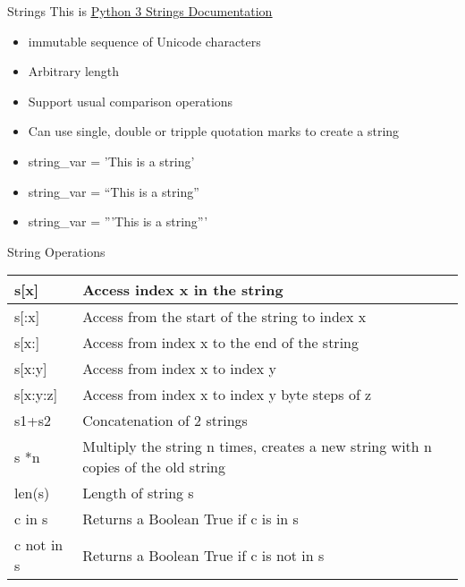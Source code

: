 % 
% 
% 
\begin{Slide}{Strings}
  This is \underline{\href{https://docs.python.org/3/library/stdtypes.html\#text-sequence-type-str}{Python 3 Strings Documentation}}\\
  \begin{itemize}
  \item immutable sequence of Unicode characters
  \item Arbitrary length
  \item Support usual comparison operations 
  \item Can use single, double or tripple quotation marks to create a string
  \item string\_var = 'This is a string'
  \item string\_var = ``This is a string''
  \item string\_var = '''This is a string'''

  \end{itemize}
\end{Slide}

% 
% 
% 
\begin{Slide}{String Operations}


  \begin{table}[h]
    \begin{tabular}{|l|p{8cm}|} \hline
      s[x]    & Access index x in the string \\ \hline
      s[:x]    & Access from the start of the string to index x \\ \hline
      s[x:]  & Access from index x to the end of the string \\ \hline 
      s[x:y]    & Access from index x to index y \\ \hline
      s[x:y:z]   & Access from index x to index y byte steps of z\\ \hline
      s1+s2   & Concatenation of 2 strings \\ \hline
      s *n  & Multiply the string n times, creates a new string with n copies of the old string \\ \hline
      len(s) & Length of string s \\ \hline
      c in s & Returns a Boolean True if c is in s \\ \hline
      c not in s & Returns a Boolean True if c is not in s \\ \hline
    \end{tabular}
  \end{table}

\end{Slide}

